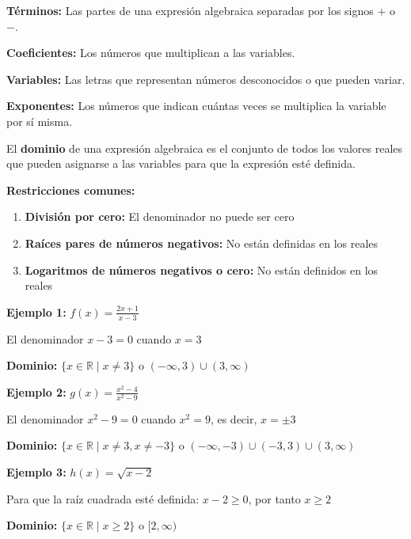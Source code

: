 \begin{definition}
\textbf{Términos:} Las partes de una expresión algebraica separadas por los signos $+$ o $-$.

\textbf{Coeficientes:} Los números que multiplican a las variables.

\textbf{Variables:} Las letras que representan números desconocidos o que pueden variar.

\textbf{Exponentes:} Los números que indican cuántas veces se multiplica la variable por sí misma.
\end{definition}


\begin{definition}
El \textbf{dominio} de una expresión algebraica es el conjunto de todos los valores reales que pueden asignarse a las variables para que la expresión esté definida.
\end{definition}

\textbf{Restricciones comunes:}
\begin{enumerate}
\item \textbf{División por cero:} El denominador no puede ser cero
\item \textbf{Raíces pares de números negativos:} No están definidas en los reales
\item \textbf{Logaritmos de números negativos o cero:} No están definidos en los reales
\end{enumerate}

\begin{example}
\textbf{Ejemplo 1:} $f(x) = \frac{2x + 1}{x - 3}$

El denominador $x - 3 = 0$ cuando $x = 3$

\textbf{Dominio:} $\{x \in \mathbb{R} \mid x \neq 3\}$ o $(-\infty, 3) \cup (3, \infty)$

\textbf{Ejemplo 2:} $g(x) = \frac{x^2 - 4}{x^2 - 9}$

El denominador $x^2 - 9 = 0$ cuando $x^2 = 9$, es decir, $x = \pm 3$

\textbf{Dominio:} $\{x \in \mathbb{R} \mid x \neq 3, x \neq -3\}$ o $(-\infty, -3) \cup (-3, 3) \cup (3, \infty)$

\textbf{Ejemplo 3:} $h(x) = \sqrt{x - 2}$

Para que la raíz cuadrada esté definida: $x - 2 \geq 0$, por tanto $x \geq 2$

\textbf{Dominio:} $\{x \in \mathbb{R} \mid x \geq 2\}$ o $[2, \infty)$
\end{example}

